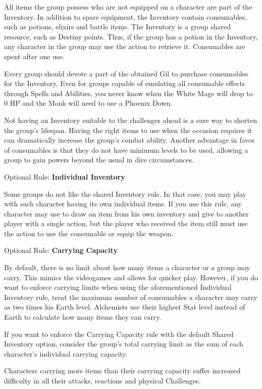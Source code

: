 \begin{multicols}{2}
All items the group possess who are not equipped on a character are part of the Inventory. In addition to spare equipment, the Inventory contain consumables, such as potions, elixirs and battle items. The Inventory is a group shared resource, such as Destiny points. Thus, if the group has a potion in the Inventory, any character in the group may use the  action to retrieve it. Consumables are spent after one use.

Every group should devote a part of the obtained Gil to purchase consumables for the Inventory. Even for groups capable of emulating all consumable effects through Spells and Abilities, you never know when the White Mage will drop to 0 HP and the Monk will need to use a Phoenix Down.

Not having an Inventory suitable to the challenges ahead is a sure way to shorten the group's lifespan. Having the right items to use when the occasion requires it can dramatically increase the group’s combat ability. Another advantage in favor of consumables is that they do not have minimum levels to be used, allowing a group to gain powers beyond the usual in dire circumstances.

\begin{center}
\end{center}

\begin{boco}
Optional Rule: \textbf{Individual Inventory} \pc%

Some groups do not like the shared Inventory rule. In that case, you may play with each character having its own individual items. If you use this rule, any character may use  to draw an item from his own inventory and give to another player with a single action, but the player who received the item still must use the  action to use the consumable or equip the weapon. \pw%

Optional Rule: \textbf{Carrying Capacity} \pc%

By default, there is no limit about how many items a character or a group may carry. This mimics the videogames and allows for quicker play. However, if you do want to enforce carrying limits when using the aforementioned Individual Inventory rule, treat the maximum number of consumables a character may carry as two times his Earth level. Alchemists use their highest Stat level instead of Earth to calculate how many items they can carry. \pc%

If you want to enforce the Carrying Capacity rule with the default Shared Inventory option, consider the group's total carrying limit as the sum of each character's individual carrying capacity. \pc%

Characters carrying more items than their carrying capacity suffer increased difficulty in all their attacks, reactions and physical Challenges.

\end{boco}

\end{multicols}


